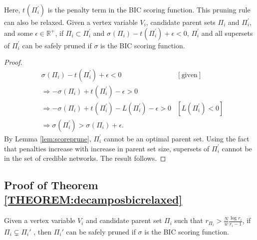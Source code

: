 \documentclass[letterpaper]{article}
\newcommand{\vertex}[1]{V_{#1}}
\newcommand{\parents}{\Pi}
\newcommand{\score}[2]{\sigma_{#1}({#2})}
\newcommand{\pen}[2]{t_{#1}({#2})}
\newenvironment{customthm}[1]
  {\renewcommand\theinnercustomthm{#1}\innercustomthm}
  {\endinnercustomthm}
\begin{document}
Here, $\pen{}{\Pi_i^{\prime}}$ is the penalty term in the BIC scoring function. This pruning rule can also be relaxed. 
\begin{customthm}{2}
Given a vertex variable $\vertex{i}$, candidate parent sets
	$\Pi_i$ and $\Pi_i^{\prime}$, and some $\epsilon \in \mathbb{R}^+$,
	if $\Pi_i \subset \Pi_i^{\prime}$ and $\score{}{\Pi_i} -  \pen{}{\Pi_i^{\prime}} + \epsilon < 0$,
	$\Pi_i^{\prime}$ and all supersets of $\Pi_i^{\prime}$ can be safely pruned if $\sigma$ is the BIC scoring function. \label{thm:decampospar}
\end{customthm}

\begin{proof}
    \begin{align*}
       &\score{}{\Pi_i} -  \pen{}{\Pi_i^{\prime}}  + \epsilon < 0  &[\text{given}]\\
       &\Rightarrow -\score{}{\Pi_i} + \pen{}{\Pi_i^{\prime}} -\epsilon > 0\\
       &\Rightarrow -\score{}{\Pi_i} + \pen{}{\Pi_i^{\prime}} - L(\Pi_i^{\prime})  - \epsilon > 0 &[L(\Pi_i^{\prime}) < 0]\\
       &\Rightarrow \score{}{\Pi_i^{\prime}} > \score{}{\Pi_i} + \epsilon.
    \end{align*}
    By Lemma \ref{lem:scoreprune}, $\Pi_i^{\prime}$ cannot be an optimal parent set. Using the fact that penalties increase with increase in parent set size, supersets of $\Pi_i^{\prime}$ cannot be in the set of credible  networks. The result follows.
\end{proof}

\subsection{Proof of Theorem \ref{THEOREM:decamposbicrelaxed}}


\begin{customthm}{3A}
\cite{CamposJ11}
	 Given a vertex variable $V_i$ and candidate parent set $\Pi_i$ such that $r_{\Pi_i}> \frac{N}{w} \frac{\log r_i}{r_i -1}$,  if $\parents_i \subsetneq \parents_i'$ , then $\parents_i'$ can be safely pruned if $\sigma$ is the BIC scoring function. \label{THEOREM:decamposbic}
\end{customthm}
\end{document}
